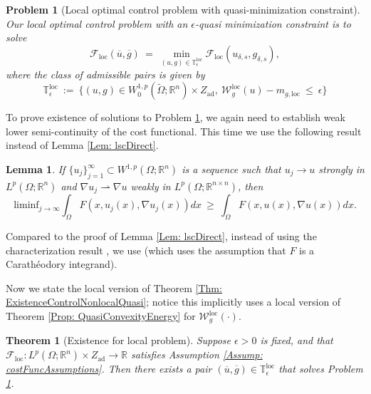 \documentclass[11pt, reqno]{amsart}   	%
\theoremstyle{plain}
\numberwithin{equation}{section}
\newtheorem{theorem}[thm]{Theorem}
\newtheorem{lemma}[thm]{Lemma}
\newtheorem{problem}[thm]{Problem}
\def\de{\delta}
\def\ep{\epsilon}
\def\Om{\Omega}
\def\R{\mathbb{R}}
\def\grad{\nabla}
\def\liminf{\text{liminf}}
\def\loc{\text{loc}}
\begin{document}
\begin{problem}[Local optimal control problem with quasi-minimization constraint]\label{Pr: LQuasiMinimizers}
    Our local optimal control problem with an $\ep$-quasi minimization constraint is to solve
    \begin{equation}\label{Eq: stateMinLQuasi}
			\mathcal{F}_{\loc}(\overline{u}, \overline{g}) \ = \ \min_{(u, g) \in \mathbb{T}^{\loc}_{\ep}}\mathcal{F}_{\loc}(u_{\de, s}, g_{\de, s}),
		\end{equation} 
        where the class of admissible pairs is given by
        \begin{equation}\label{Eq: localAdmissSetQuasiEp}
    \mathbb{T}^{\loc}_{\ep} \ := \ \{(u, g) \in W^{1, p}_0(\widetilde{\Om}; \R^n) \times Z_{\text{ad}}, \ \mathcal{W}^{\loc}_g(u) - m_{g, \loc} \ \leq \ \ep\}
\end{equation}
\end{problem}

 To prove existence of solutions to Problem \ref{Pr: LQuasiMinimizers}, we again need to establish weak lower semi-continuity of the cost functional. This time we use the following result instead of Lemma \ref{Lem: lscDirect}.

 \begin{lemma}\label{Lem: lscDirectLocal}
     If  $\{u_j\}^{\infty}_{j = 1} \subset W^{1, p}(\Om; \R^n)$ is a sequence such that $u_j \rightarrow u$ strongly in $L^p(\Om; \R^n)$ and $\grad u_j \rightharpoonup \grad u$ weakly in $L^p(\Om; \R^{n \times n})$, then
            \begin{equation}\label{Eq: lscFloc}
                \liminf_{j \rightarrow \infty}\int_{\Om}F(x, u_j(x), \grad u_j(x))dx \ \geq \ \int_{\Om}F(x, u(x), \grad u(x))dx.
            \end{equation}
 \end{lemma}

 Compared to the proof of Lemma \ref{Lem: lscDirect}, instead of using the characterization result \cite[Theorem 5]{cueto2023variational}, we use \cite[Theorem 8.11]{dacorogna2007direct} (which uses the assumption that $F$ is a Carathéodory integrand). 

Now we state the local version of Theorem \ref{Thm: ExistenceControlNonlocalQuasi}; notice this implicitly uses a local version of Theorem \ref{Prop: QuasiConvexityEnergy} for $\mathcal{W}^{\loc}_g(\cdot)$.

        \begin{theorem}[Existence for local problem]\label{Thm: ExistenceControlLocalQuasi}
        Suppose  $\ep > 0$ is fixed, and that $\mathcal{F}_{\loc}: L^p(\Om; \R^n) \times Z_{\text{ad}} \rightarrow \R$ satisfies Assumption \ref{Assump: costFuncAssumptions}. Then there exists a pair $(\overline{u}, \overline{g}) \in \mathbb{T}^{\loc}_{\ep}$ that solves Problem \ref{Pr: LQuasiMinimizers}.
    \end{theorem}
\end{document}
